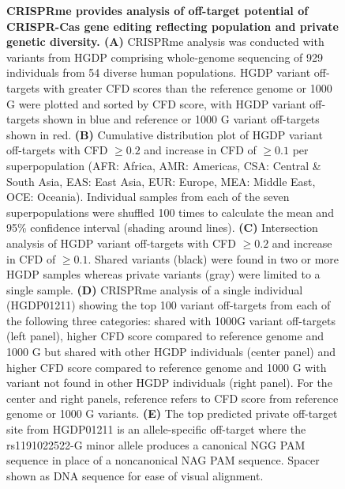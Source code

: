 \documentclass[a4paper, titlepage, openright]{book}
\newcommand{\crisprme}{CRISPRme\xspace}
\begin{document}
\begin{figure}
	\caption[\crisprme provides analysis of off-target potential of CRISPR-Cas gene editing reflecting population and private genetic diversity]{\textbf{\crisprme provides analysis of off-target potential of CRISPR-Cas gene editing reflecting population and private genetic diversity. (A)} \crisprme analysis was conducted with variants from HGDP comprising whole-genome sequencing of 929 individuals from 54 diverse human populations. HGDP variant off-targets with greater CFD scores than the reference genome or 1000 G were plotted and sorted by CFD score, with HGDP variant off-targets shown in blue and reference or 1000 G variant off-targets shown in red. \textbf{(B)} Cumulative distribution plot of HGDP variant off-targets with CFD $\geq 0.2$ and increase in CFD of $\geq 0.1$ per superpopulation (AFR: Africa, AMR: Americas, CSA: Central \& South Asia, EAS: East Asia, EUR: Europe, MEA: Middle East, OCE: Oceania). Individual samples from each of the seven superpopulations were shuffled 100 times to calculate the mean and 95\% confidence interval (shading around lines).  \textbf{(C)} Intersection analysis of HGDP variant off-targets with CFD $\geq 0.2$ and increase in CFD of $\geq 0.1$. Shared variants (black) were found in two or more HGDP samples whereas private variants (gray) were limited to a single sample. \textbf{(D)} \crisprme analysis of a single individual (HGDP01211) showing the top 100 variant off-targets from each of the following three categories: shared with 1000G variant off-targets (left panel), higher CFD score compared to reference genome and 1000 G but shared with other HGDP individuals (center panel) and higher CFD score compared to reference genome and 1000 G with variant not found in other HGDP individuals (right panel). For the center and right panels, reference refers to CFD score from reference genome or 1000 G variants.  \textbf{(E)} The top predicted private off-target site from HGDP01211 is an allele-specific off-target where the rs1191022522-G minor allele produces a canonical NGG PAM sequence in place of a noncanonical NAG PAM sequence. Spacer shown as DNA sequence for ease of visual alignment.}
	\label{fig:crisprme4}
\end{figure}
\end{document}
